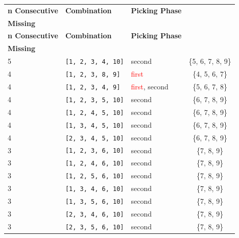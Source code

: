\small
\begin{longtable}{|p{2.5cm}|p{3cm}|p{2.5cm}|c|}
\hline
\rowcolor{black!20}
\textbf{n Consecutive} & \textbf{Combination} & \textbf{Picking Phase} & \makecell{\textbf{Consecutive} \\ \textbf{Missing}} \\ 
\hline
\endfirsthead

\hline
\rowcolor{black!20}
\textbf{n Consecutive} & \textbf{Combination} & \textbf{Picking Phase} & \makecell{\textbf{Consecutive} \\ \textbf{Missing}} \\ 
\hline
\endhead

5 & \texttt{[1, 2, 3, 4, 10]} & \textcolor{CustomBlue}{second} & \{5, 6, 7, 8, 9\} \\ \hline \hline 

\rowcolor{Light_Blue}
4 & \texttt{[1, 2, 3, 8, 9]} & \textcolor{red}{first} & \{4, 5, 6, 7\} \\ \hline \hline
4 & \texttt{[1, 2, 3, 4, 9]} & \textcolor{red}{first}, \textcolor{CustomBlue}{second} & \{5, 6, 7, 8\} \\ \hline \hline
4 & \texttt{[1, 2, 3, 5, 10]} & \textcolor{CustomBlue}{second} & \{6, 7, 8, 9\} \\ 
4 & \texttt{[1, 2, 4, 5, 10]} & \textcolor{CustomBlue}{second} & \{6, 7, 8, 9\} \\ 
4 & \texttt{[1, 3, 4, 5, 10]} & \textcolor{CustomBlue}{second} & \{6, 7, 8, 9\} \\ 
4 & \texttt{[2, 3, 4, 5, 10]} & \textcolor{CustomBlue}{second} & \{6, 7, 8, 9\} \\ \hline \hline 

\rowcolor{Light_Blue}
3 & \texttt{[1, 2, 3, 6, 10]} & \textcolor{CustomBlue}{second} & \{7, 8, 9\} \\ 
3 & \texttt{[1, 2, 4, 6, 10]} & \textcolor{CustomBlue}{second} & \{7, 8, 9\} \\ 
3 & \texttt{[1, 2, 5, 6, 10]} & \textcolor{CustomBlue}{second} & \{7, 8, 9\} \\ 
3 & \texttt{[1, 3, 4, 6, 10]} & \textcolor{CustomBlue}{second} & \{7, 8, 9\} \\ 
3 & \texttt{[1, 3, 5, 6, 10]} & \textcolor{CustomBlue}{second} & \{7, 8, 9\} \\ 
3 & \texttt{[2, 3, 4, 6, 10]} & \textcolor{CustomBlue}{second} & \{7, 8, 9\} \\ 
3 & \texttt{[2, 3, 5, 6, 10]} & \textcolor{CustomBlue}{second} & \{7, 8, 9\} \\ \hline \hline


\end{longtable}
